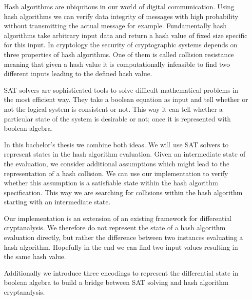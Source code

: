 Hash algorithms are ubiquitous in our world of digital communication.
Using hash algorithms we can verify data integrity of messages with high
probability without transmitting the actual message for example. Fundamentally
hash algorithms take arbitrary input data and return a hash value of fixed
size specific for this input. In cryptology the security of cryptographic
systems depends on three properties of hash algorithms. One of them is called
collision resistance meaning that given a hash value it is computationally
infeasible to find two different inputs leading to the defined hash value.

SAT solvers are sophisticated tools to solve difficult mathematical problems
in the most efficient way. They take a boolean equation as input and tell
whether or not the logical system is consistent or not. This way it can tell
whether a particular state of the system is desirable or not; once it is
represented with boolean algebra.

In this bachelor's thesis we combine both ideas. We will use SAT solvers to
represent states in the hash algorithm evaluation. Given an intermediate
state of the evaluation, we consider additional assumptions which might
lead to the representation of a hash collision. We can use our implementation
to verify whether this assumption is a satisfiable state within the hash algorithm
specification. This way we are searching for collisions within the hash
algorithm starting with an intermediate state.

Our implementation is an extension of an existing framework for differential
cryptanalysis. We therefore do not represent the state of a hash algorithm
evaluation directly, but rather the difference between two instances evaluating
a hash algorithm. Hopefully in the end we can find two input values resulting
in the same hash value.

Additionally we introduce three encodings to represent the differential state
in boolean algebra to build a bridge between SAT solving and hash algorithm
cryptanalysis.
